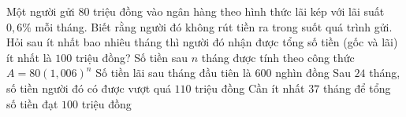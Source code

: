 \begin{ex}%
	Một người gửi $80$ triệu đồng vào ngân hàng theo hình thức  lãi kép với lãi suất $0{,}6\%$ mỗi tháng. Biết rằng người đó không rút tiền ra trong suốt quá trình gửi. Hỏi sau ít nhất bao nhiêu tháng thì người đó nhận được tổng số tiền (gốc và lãi) ít nhất là $100$ triệu đồng?
	 \choiceTF
		 {\True Số tiền sau $n$ tháng được tính theo công thức $A = 80(1{,}006)^n$}
		{Số tiền lãi sau tháng đầu tiên là $600$ nghìn  đồng}
		 {Sau $24$ tháng, số tiền người đó có được vượt quá $110$ triệu đồng}
		{\True Cần  ít nhất $37$ tháng để tổng số tiền đạt $100$ triệu đồng}
\end{ex}

